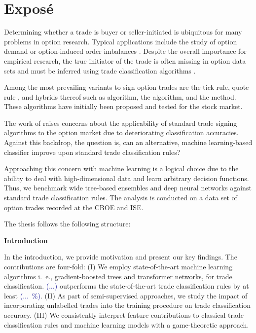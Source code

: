 \section{Exposé}
\label{sec:expose}

Determining whether a trade is buyer or seller-initiated is ubiquitous for many problems in option research. Typical applications include the study of option demand \autocite{garleanuDemandBasedOptionPricing2009} or option-induced order imbalances \autocite{huDoesOptionTrading2014}. Despite the overall importance for empirical research, the true initiator of the trade is often missing in option data sets and must be inferred using trade classification algorithms \autocite{easleyOptionVolumeStock1998}. 

Among the most prevailing variants to sign option trades are the tick rule, quote rule \autocite{hasbrouckTradesQuotesInventories1988}, and hybrids thereof such as \autocite[LR,][]{leeInferringTradeDirection1991} algorithm, the \autocite[EMO,][]{ellisAccuracyTradeClassification2000} algorithm, and the  \autocite[CLVN,][]{chakrabartyTradeClassificationAlgorithms2007} method. These algorithms have initially been proposed and tested for the stock market.

The work of \textcites{grauerOptionTradeClassification2022}{savickasInferringDirectionOption2003} raises concerns about the applicability of standard trade signing algorithms to the option market due to deteriorating classification accuracies. Against this backdrop, the question is, can an alternative, machine learning-based classifier improve upon standard trade classification rules? 

Approaching this concern with machine learning is a logical choice due to the ability to deal with high-dimensional data and learn arbitrary decision functions. Thus, we benchmark wide tree-based ensembles and deep neural networks against standard trade classification rules. The analysis is conducted on a data set of option trades recorded at the \gls{CBOE} and \gls{ISE}.

The thesis follows the following structure:

\textbf{Introduction}

In the introduction, we provide motivation and present our key findings. The contributions are four-fold: (I) We employ state-of-the-art machine learning algorithms i.~e., gradient-boosted trees and transformer networks, for trade classification. \textcolor{darkblue}{(...)} outperforms the state-of-the-art trade classification rules by at least \textcolor{darkblue}{(...~\%)}. (II) As part of semi-supervised approaches, we study the impact of incorporating unlabelled trades into the training procedure on trade classification accuracy. (III) We consistently interpret feature contributions to classical trade classification rules and machine learning models with a game-theoretic approach.

